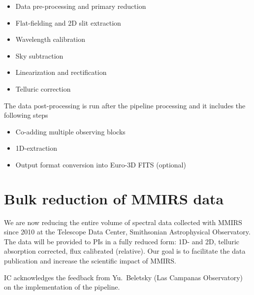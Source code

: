 \documentclass[11pt,twoside]{article}
\begin{document}
\begin{itemize}
\item  Data pre-processing and primary reduction 
\item  Flat-fielding and 2D slit extraction
\item  Wavelength calibration
\item  Sky subtraction
\item  Linearization and rectification
\item  Telluric correction
\end{itemize}

The data post-processing is run after the pipeline processing and it
includes the following steps
\begin{itemize}
\item Co-adding multiple observing blocks
\item 1D-extraction
\item Output format conversion into Euro-3D FITS (optional)
\end{itemize}

\section{Bulk reduction of MMIRS data}
We are now reducing the entire volume of spectral data collected with MMIRS
since 2010 at the Telescope Data Center, Smithsonian Astrophysical
Observatory. The data will be provided to PIs in a fully reduced form: 1D-
and 2D, telluric absorption corrected, flux calibrated (relative). Our goal
is to facilitate the data publication and increase the scientific impact of
MMIRS.

\acknowledgements 
IC acknowledges the feedback from Yu.~Beletsky (Las Campanas Observatory) on
the implementation of the pipeline.

%
\end{document}
